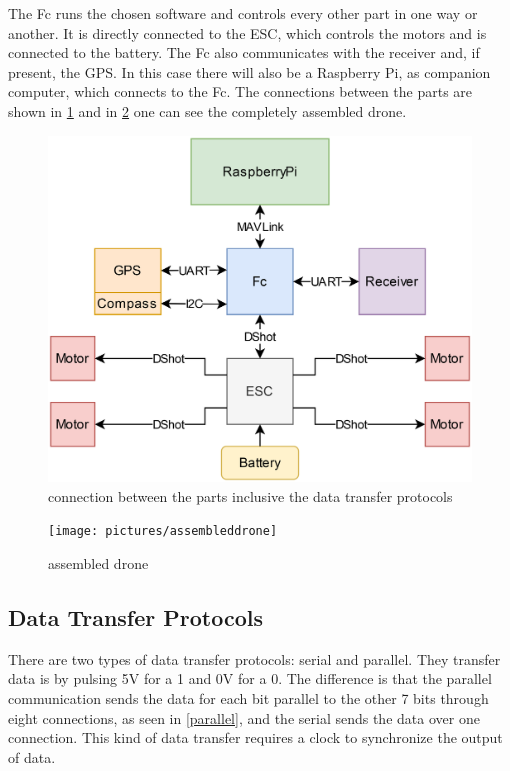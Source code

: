 \documentclass[svgnames]{article}
\begin{document}
	\newpage
	The \gls{Fc} runs the chosen software and controls every other part in one way or another. It is directly connected to the \gls{ESC}, which controls the motors and is connected to the battery. The \gls{Fc} also communicates with the receiver and, if present, the \gls{GPS}. In this case there will also be a Raspberry Pi, as companion computer, which connects to the \gls{Fc}. The connections between the parts are shown in \cref{fig:connectionscorrect2} and in \cref{fig:assembleddrone} one can see the completely assembled drone.
\begin{figure}[ht]
	\centering
	\includegraphics[width=0.7\linewidth]{pictures/connectionscorrect2}
	\caption{connection between the parts inclusive the data transfer protocols}
	\label{fig:connectionscorrect2}
\end{figure}

\begin{figure}[ht]
	\centering
	\texttt{[image: pictures/assembleddrone]}
	\caption{assembled drone}
	\label{fig:assembleddrone}
\end{figure}
	\subsection{Data Transfer Protocols}
	There are two types of data transfer protocols: serial and parallel. They transfer data is by pulsing 5V for a 1 and 0V for a 0. The difference is that the parallel communication sends the data for each bit parallel to the other 7 bits through eight connections, as seen in \cref{parallel}, and the serial sends the data over one connection. This kind of data transfer requires a clock to synchronize the output of data.
\end{document}
